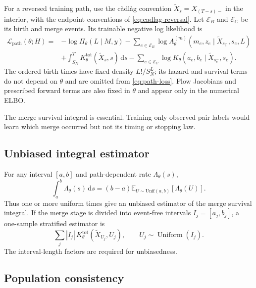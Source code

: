 \documentclass[10pt]{article}
\theoremstyle{definition}
\theoremstyle{remark}
\newcommand{\E}{\mathbb{E}}
\newcommand{\dd}{\,\mathrm{d}}
\begin{document}
For a reversed training path, use the c\`adl\`ag convention
$\widetilde X_s=X_{(T-s)-}$ in the interior, with the endpoint conventions
of \eqref{eq:cadlag-reversal}.  Let $\mathcal E_B$ and $\mathcal E_C$ be its
birth and merge events.  Its trainable negative log likelihood is
\begin{align}
  \mathcal L_{\mathrm{path}}(\theta;H)
  ={}&
  -\log\Pi_\theta(L\mid M,y)
  -\sum_{e\in\mathcal E_B}
    \log A_\theta^{(m)}(m_e,z_e\mid\widetilde X_{s_e^-},s_e,L)
  \nonumber\\
  &+\int_{S_N}^{T}K_\theta^{\mathrm{tot}}(\widetilde X_s,s)\dd s
  -\sum_{e\in\mathcal E_C}
  \log K_\theta(a_e,b_e\mid\widetilde X_{s_e^-},s_e).
  \label{eq:path-loss}
\end{align}
The ordered birth times have fixed density $L!/S_N^L$; its hazard and
survival terms do not depend on $\theta$ and are omitted from
\eqref{eq:path-loss}.  Flow Jacobians and prescribed forward terms are also
fixed in $\theta$ and appear only in the numerical ELBO.

The merge survival integral is essential.  Training only observed pair
labels would learn which merge occurred but not its timing or stopping law.

\subsection{Unbiased integral estimator}

For any interval $[a,b]$ and path-dependent rate $\Lambda_\theta(s)$,
\begin{equation}
  \int_a^b\Lambda_\theta(s)\dd s
  =(b-a)\E_{U\sim\mathrm{Unif}(a,b)}[\Lambda_\theta(U)].
  \label{eq:uniform-integral-estimator}
\end{equation}
Thus one or more uniform times give an unbiased estimator of the merge
survival integral.  If the merge stage is divided into event-free intervals
$I_j=[a_j,b_j]$, a one-sample stratified estimator is
\begin{equation}
  \sum_j |I_j|\,K_\theta^{\mathrm{tot}}(\widetilde X_{U_j},U_j),
  \qquad U_j\sim\operatorname{Uniform}(I_j).
  \label{eq:stratified-integral-estimator}
\end{equation}
The interval-length factors are required for unbiasedness.

\subsection{Population consistency}
\end{document}
